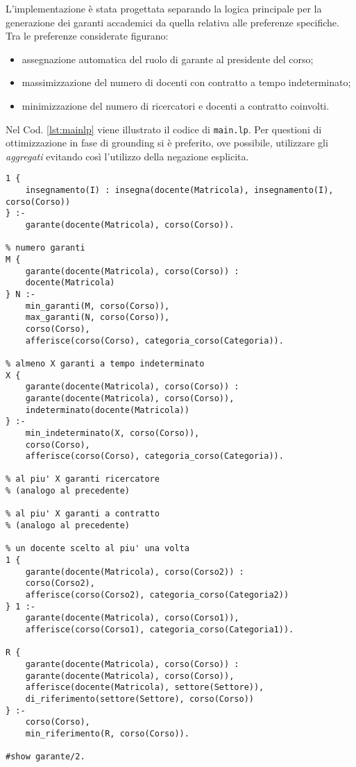 \documentclass[journal]{IEEEtran}
\begin{document}
L'implementazione è stata progettata separando la logica principale per la
generazione dei garanti accademici da quella relativa alle preferenze
specifiche. Tra le preferenze considerate figurano:  \begin{itemize} \item
	assegnazione automatica del ruolo di garante al presidente del corso;  \item
massimizzazione del numero di docenti con contratto a tempo indeterminato;
\item minimizzazione del numero di ricercatori e docenti a contratto coinvolti.
\end{itemize}

Nel Cod. \ref{lst:mainlp} viene illustrato il codice di \texttt{main.lp}. Per
questioni di ottimizzazione in fase di grounding si è preferito, ove possibile, utilizzare gli
\textit{aggregati} evitando così l'utilizzo della negazione esplicita.

\begin{center}
\begin{lstlisting}[style=asp, caption={Codice ASP del file \texttt{main.lp}.}, label={lst:mainlp}]
% se garante allora insegna almeno una materia
1 {
    insegnamento(I) : insegna(docente(Matricola), insegnamento(I), corso(Corso))
} :-
    garante(docente(Matricola), corso(Corso)).

% numero garanti
M {
    garante(docente(Matricola), corso(Corso)) :
    docente(Matricola)
} N :-
    min_garanti(M, corso(Corso)),
    max_garanti(N, corso(Corso)),
    corso(Corso),
    afferisce(corso(Corso), categoria_corso(Categoria)).

% almeno X garanti a tempo indeterminato
X {
    garante(docente(Matricola), corso(Corso)) :
    garante(docente(Matricola), corso(Corso)),
    indeterminato(docente(Matricola))
} :-
    min_indeterminato(X, corso(Corso)),
    corso(Corso),
    afferisce(corso(Corso), categoria_corso(Categoria)).

% al piu' X garanti ricercatore
% (analogo al precedente)

% al piu' X garanti a contratto
% (analogo al precedente)

% un docente scelto al piu' una volta
1 {
    garante(docente(Matricola), corso(Corso2)) :
    corso(Corso2),
    afferisce(corso(Corso2), categoria_corso(Categoria2))
} 1 :-
    garante(docente(Matricola), corso(Corso1)),
    afferisce(corso(Corso1), categoria_corso(Categoria1)).

R {
    garante(docente(Matricola), corso(Corso)) :
    garante(docente(Matricola), corso(Corso)),
    afferisce(docente(Matricola), settore(Settore)),
    di_riferimento(settore(Settore), corso(Corso))
} :-
    corso(Corso),
    min_riferimento(R, corso(Corso)).

#show garante/2.
\end{lstlisting}
\end{center}
\end{document}
